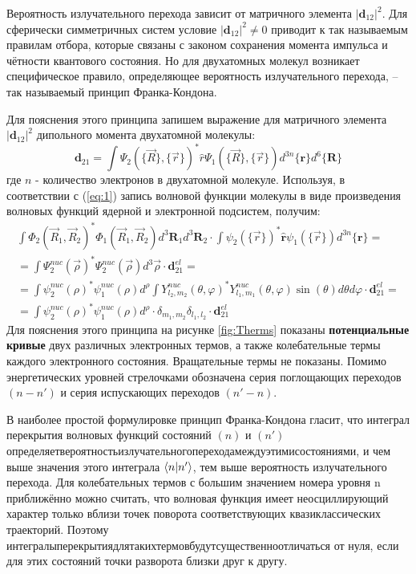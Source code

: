 \documentclass[a4paper, 12pt]{article}
\begin{document}
Вероятность излучательного перехода зависит от матричного элемента $|\textbf{d}_{12}|^2$. Для сферически симметричных систем условие $|\textbf{d}_{12}|^2\neq 0$ приводит к так называемым правилам отбора, которые связаны с законом сохранения момента импульса и чётности квантового состояния. Но для двухатомных молекул возникает специфическое  правило, определяющее вероятность излучательного перехода, -- так называемый принцип Франка-Кондона.

Для пояснения этого принципа запишем выражение для матричного элемента $|\textbf{d}_{12}|^2$ дипольного момента двухатомной молекулы:
\begin{equation}
	\textbf{d}_{21}=\int\Psi_2(\{\vec{R}\},\{\vec{r}\})^*\hat{r}\Psi_1(\{\vec{R}\},\{\vec{r}\})d^{3n}\{\textbf{r}\}d^6\{\textbf{R}\}
\end{equation}
где $n$ - количество электронов в двухатомной молекуле. Используя, в соответствии с (\ref{eq:1}) запись волновой функции молекулы в виде произведения волновых функций ядерной и электронной подсистем, получим:
\begin{equation}
\begin{aligned}
\int\Phi_2(\vec{R}_1,\vec{R}_2)^*\Phi_1(\vec{R}_1,\vec{R}_2)d^3\textbf{R}_1d^3\textbf{R}_2\cdot\int\psi_2(\{\vec{r}\})^*\hat{\textbf{r}}\psi_1(\{\vec{r}\})d^{3n}\{\textbf{r}\}=\\
=\int\Psi_2^{nuc}(\vec{\rho})^*\Psi_2^{nuc}(\vec{\rho})d^3\vec{\rho}\cdot\textbf{d}_{21}^{el}=\\
=\int\psi_2^{nuc}(\rho)^*\psi_1^{nuc}(\rho)d^{\rho}\int Y^{nuc}_{l_2,m_2}(\theta,\varphi)^*Y^{nuc}_{l_1,m_1}(\theta,\varphi)\sin(\theta)d\theta d\varphi\cdot\textbf{d}_{21}^{el}=\\
=\int\psi^{nuc}_2(\rho)^*\psi_1^{nuc}(\rho)d^{\rho}\cdot\delta_{m_1,m_2}\delta_{l_1,l_2}\cdot\textbf{d}_{21}^{el}
\end{aligned}
\end{equation}
Для пояснения этого принципа на рисунке \ref{fig:Therms} показаны \textbf{потенциальные кривые} двух различных электронных термов, а также колебательные термы каждого электронного состояния. Вращательные термы не показаны. Помимо энергетических уровней стрелочками обозначена серия поглощающих переходов $(n-n')$ и серия испускающих переходов $(n'-n)$.

В наиболее простой формулировке принцип Франка-Кондона гласит, что интеграл перекрытия волновых функций состояний $(n)$ и $(n')$ определяетвероятностьизлучательногопереходамеждуэтимисостояниями, и чем выше значения этого интеграла $\bra{n}\ket{n'}$, тем выше вероятность излучательного перехода. Для колебательных термов с большим значением номера уровня n приближённо можно считать, что волновая функция имеет неосциллирующий характер только вблизи точек поворота соответствующих квазиклассических траекторий. Поэтому интегралыперекрытиядлятакихтермовбудутсущественноотличаться от нуля, если для этих состояний точки разворота близки друг к другу.
\newpage
\end{document}
